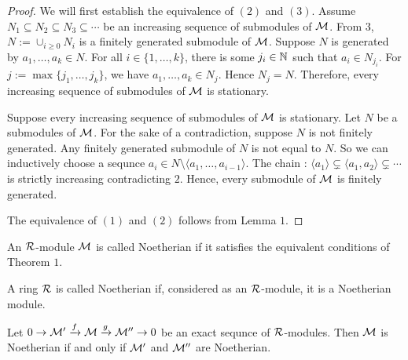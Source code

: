 \begin{proof}
  We will first establish the equivalence of $(2)$ and $(3)$.
  Assume $N_1\subseteq N_2\subseteq N_3\subseteq \cdots$ be an increasing sequence of submodules of $\mathcal{M}$. From $3$, $N:=\cup_{i\geq 0} N_i$ is a finitely generated submodule of $\mathcal{M}$. Suppose $N$ is generated by $a_1,\ldots, a_k\in N$. For all $i\in \{1,\ldots, k\}$, there is some $j_i \in \mathbb{N}$ such that $a_i\in N_{j_i}$.
  For $j:=\max\{j_1,\ldots, j_k\}$, we have $a_1,\ldots, a_k\in N_j$. Hence $N_j = N$. Therefore, every increasing sequence of submodules of $\mathcal{M}$ is stationary.

  Suppose every increasing sequence of submodules of $\mathcal{M}$ is stationary. Let $N$ be a submodules of $\mathcal{M}$. For the sake of a contradiction, suppose $N$ is not finitely generated. Any finitely generated submodule of $N$ is not equal to $N$. So we can inductively choose a sequnce $a_i\in N\setminus \langle a_1,\ldots, a_{i-1}\rangle$. The chain : $\langle a_1\rangle \subsetneq \langle a_1,a_2\rangle \subsetneq \cdots$ is strictly increasing contradicting $2$. Hence, every submodule of $\mathcal{M}$ is finitely generated.

  The equivalence of $(1)$ and $(2)$ follows from Lemma $1$.
\end{proof}

\begin{definition}
  An $\mathcal{R}$-module $\mathcal{M}$ is called Noetherian if it satisfies the equivalent conditions of Theorem $1$.
\end{definition}
\begin{definition}
 A ring $\mathcal{R}$ is called Noetherian if, considered as an $\mathcal{R}$-module, it is a Noetherian module.
\end{definition}

\begin{prop}
  Let $0\rightarrow \mathcal{M}'\xrightarrow{f}\mathcal{M}\xrightarrow{g}\mathcal{M}''\rightarrow 0$ be an exact sequnce of $\mathcal{R}$-modules. Then $\mathcal{M}$ is Noetherian if and only if $\mathcal{M}'$ and $\mathcal{M}''$ are Noetherian.
\end{prop}

